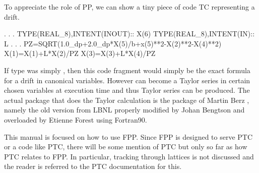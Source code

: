 \documentclass{hitec}     %
\begin{document}
To appreciate the role of PP, we can show a tiny piece of code  TC representing a drift.
\begin{code}
                      .
                      .
                      .
    TYPE(REAL_8),INTENT(INOUT):: X(6)
    TYPE(REAL_8),INTENT(IN):: L
                      .
                      .
                      .
          PZ=SQRT(1.0_dp+2.0_dp*X(5)/b+x(5)**2-X(2)**2-X(4)**2)
          X(1)=X(1)+L*X(2)/PZ
          X(3)=X(3)+L*X(4)/PZ
\end{code}         
 
If  type  was simply , then this code fragment would simply be the exact formula for a drift in canonical variables. However  can become a Taylor series in certain chosen variables at execution time and thus Taylor series can be produced. The actual package that does the Taylor calculation is the package of Martin Berz\cite{b:berz.da}
, namely the old version from LBNL properly modified by Johan Bengtson and overloaded by Etienne Forest using Fortran90.
 






This manual is focused on how to use FPP. Since FPP is designed to serve PTC or a code like PTC, there will be some
mention of PTC but only so far as how PTC relates to FPP. In particular, tracking through lattices
is not discussed and the reader is referred to the PTC documentation for this.
\end{document}
